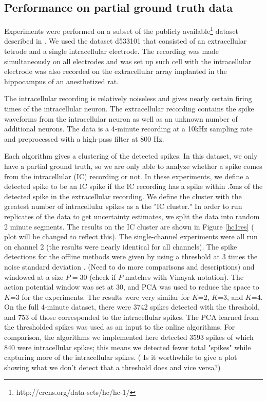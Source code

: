 \subsection{Performance on partial ground truth data}
Experiments were performed on a subset of the publicly available\footnote{http://crcns.org/data-sets/hc/hc-1/} dataset described in \cite{Henze2000}.  We used the dataset d533101 that consisted of an extracellular tetrode and a single intracellular electrode.  The recording was made simultaneously on all electrodes and was set up such cell with the intracellular electrode was also recorded on the extracellular array implanted in the hippocampus of an anesthetized rat.

The intracellular recording is relatively noiseless and gives nearly certain firing times of the intracellular neuron.  The extracellular recording contains the spike waveforms from the intracellular neuron as well as an unknown number of additional neurons.  The data is a 4-minute recording at a 10kHz sampling rate and preprocessed with a high-pass filter at 800 Hz.

Each algorithm gives a clustering of the detected spikes.  In this dataset, we only have a partial ground truth, so we are only able to analyze whether a spike comes from the intracellular (IC) recording or not.  In these experiments, we define a detected spike to be an IC spike if the IC recording has a spike within .5ms of the detected spike in the extracellular recording.  We define the cluster with the greatest number of intracellular spikes as a the "IC cluster."  In order to run replicates of the data to get uncertainty estimates, we split the data into random 2 minute segments.  The results on the IC cluster are shown in Figure \ref{hc1res} ({\color{red} plot will be changed to reflect this}).  The single-channel experiments were all run on channel 2 (the results were nearly identical for all channels).  The spike detections for the offline methods were given by using a threshold at 3 times the noise standard deviation \cite{Lewicki}. (Need to do more comparisons and descriptions) and windowed at a size $P=30$ (check if $P$ matches with Vinayak notation).  The action potential window was set at 30, and PCA was used to reduce the space to $K$=3 for the experiments.  The results were very similar for $K$=2, $K$=3, and $K$=4.   On the full 4-minute dataset, there were 3742 spikes detected with the threshold, and 753 of those corresponded to the intracellular spikes.  The PCA learned from the thresholded spikes was used as an input to the online algorithms.  For comparison, the algorithms we implemented here detected 3593 spikes of which 840 were intracellular spikes; this means we detected fewer total "spikes" while capturing more of the intracellular spikes. ({\color{red}  Is it worthwhile to give a plot showing what we don't detect that a threshold does and vice versa?})

